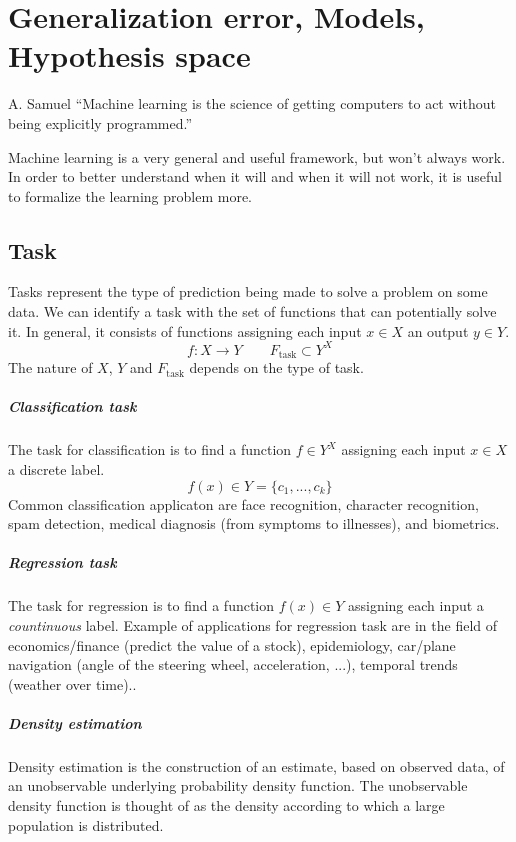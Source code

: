\chapter{Generalization error, Models, Hypothesis space}
\begin{chapquote}{A. Samuel}
    ``Machine learning is the science of getting computers to act without being explicitly programmed.''
\end{chapquote}

Machine learning is a very general and useful framework, but won't always work. In order to better understand when it will and when it will not work, it is useful to formalize the learning problem more.

\section{Task}
Tasks represent the type of prediction being made to solve a problem on some data. We can identify a task with the set of functions that can potentially solve it. In general, it consists of functions assigning each input \(x \in X\) an output \(y \in Y\).
\[f: X \to Y \qquad F_{\text{task}} \subset Y^X\]
The nature of \(X\), \(Y\) and \(F_{\text{task}}\) depends on the type of task.

\paragraph{Classification task}
The task for classification is to find a function \(f \in Y^X\) assigning each input \(x \in X\) a discrete label.
\[f(x) \in Y = \{c_1,...,c_k\}\]
Common classification applicaton are face recognition, character recognition, spam detection, medical diagnosis (from symptoms to illnesses), and biometrics.

\paragraph{Regression task}
The task for regression is to find a function \(f(x) \in Y\) assigning each input a \emph{countinuous} label.
Example of applications for regression task are in the field of economics/finance (predict the value of a stock), epidemiology, car/plane navigation (angle of the steering wheel, acceleration, ...), temporal trends (weather over time)..

\paragraph{Density estimation}
Density estimation is the construction of an estimate, based on observed data, of an unobservable underlying probability density function. The unobservable density function is thought of as the density according to which a large population is distributed.

